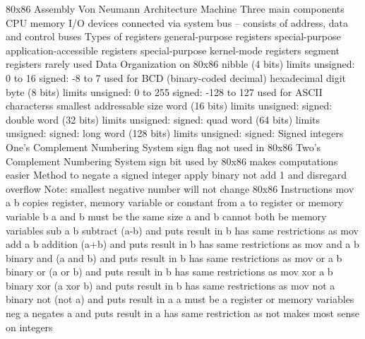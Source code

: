 \documentclass[twocolumn]{article}
\begin{document}
80x86 Assembly
Von Neumann Architecture Machine
Three main components
CPU
memory
I/O devices
connected via system bus – consists of address, data and control buses
Types of registers
general-purpose registers
special-purpose application-accessible registers
special-purpose kernel-mode registers
segment registers
rarely used
Data Organization on 80x86
nibble (4 bits)
limits
unsigned: 0 to 16
signed: -8 to 7
used for
BCD (binary-coded decimal)
hexadecimal digit
byte (8 bits)
limits
unsigned: 0 to 255
signed: -128 to 127
used for ASCII characterss
smallest addressable size
word (16 bits)
limits
unsigned:
signed:
double word (32 bits)
limits
unsigned:
signed:
quad word (64 bits)
limits
unsigned:
signed:
long word (128 bits)
limits
unsigned:
signed:
Signed integers
One's Complement Numbering System
sign flag
not used in 80x86
Two's Complement Numbering System
sign bit
used by 80x86
makes computations easier
Method to negate a signed integer
apply binary not
add 1 and disregard overflow
Note: smallest negative number will not change
80x86 Instructions
mov a b
copies register, memory variable or constant from a to register or memory variable b
a and b must be the same size
a and b cannot both be memory variables
sub a b
subtract (a-b) and puts result in b
has same restrictions as mov
add a b
addition (a+b) and puts result in b
has same restrictions as mov
and a b
binary and (a and b) and puts result in b
has same restrictions as mov
or a b
binary or (a or b) and puts result in b
has same restrictions as mov
xor a b
binary xor (a xor b) and puts result in b
has same restrictions as mov
not a
binary not (not a) and puts result in a
a must be a register or memory variables
neg a
negates a and puts result in a
has same restriction as not
makes most sense on integers
\end{document}
